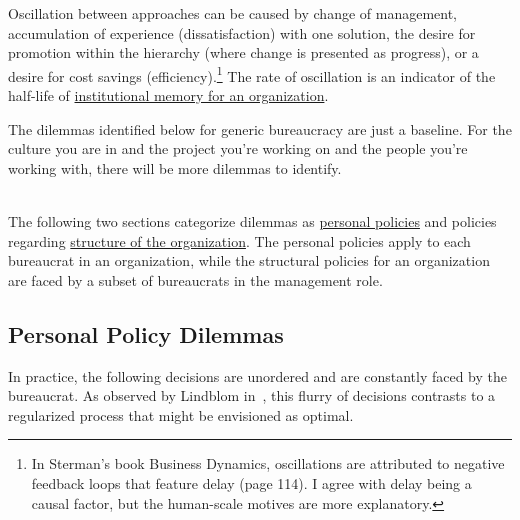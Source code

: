 Oscillation between approaches can be caused by change of management, accumulation of experience (dissatisfaction) with one solution, the desire for promotion within the hierarchy (where change is presented as progress), or a desire for cost savings (efficiency).\footnote{In Sterman's book Business Dynamics\cite{2000_Sterman}, oscillations are attributed to negative feedback loops that feature delay (page 114). I agree with delay being a causal factor, but the human-scale motives
are more explanatory.} The rate of oscillation is an indicator of the half-life of \href{https://en.wikipedia.org/wiki/Institutional_memory}{institutional memory for an organization}. 

The dilemmas identified below for generic bureaucracy are just a baseline. For the culture you are in and the project you're working on and the people you're working with, there will be more dilemmas to identify. 

\ \\

The following two sections categorize dilemmas as \hyperref[sec:personal-policy-dilemmas]{personal policies} 
{} 
and policies regarding \hyperref[sec:org-dilemma]{structure of the organization}.
{} 
The personal policies apply to each bureaucrat in an organization, while the structural policies for an organization are faced by a subset of bureaucrats in the management role. 

\subsection*{Personal Policy Dilemmas \label{sec:personal-policy-dilemmas}}

In practice, the following decisions are unordered and are constantly faced by the bureaucrat. As observed by Lindblom in~\cite{1959_Lindblom}, this flurry of decisions contrasts to a regularized process that might be envisioned as optimal.


